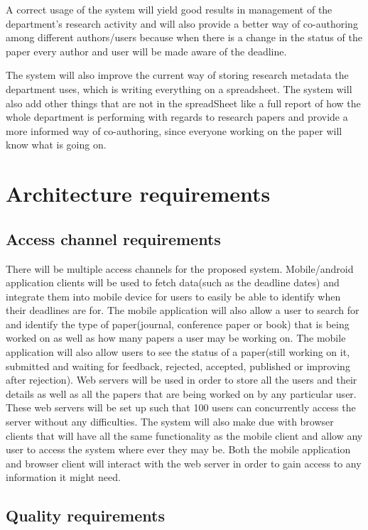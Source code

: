 \documentclass[a4paper,12pt]{report}
\begin{document}
A correct usage of the system will yield good results in management of the department's research activity and will also provide a better way of co-authoring among different authors/users because when there is a change in the status of the paper every author and user will be made aware of the deadline.

The system will also improve the current way of storing research metadata the department uses, which is  writing everything on a spreadsheet. The system will also add other things that are not in the spreadSheet like a full report of how the whole department is performing with regards to research papers and provide a more informed way of co-authoring, since everyone working on the paper will know what is going on.

\newpage
\section{Architecture requirements}
\subsection{Access channel requirements}

There will be multiple access channels for the proposed system. Mobile/android application clients will be used to fetch data(such as the deadline dates) and integrate them into mobile device for users to easily be able to identify when their deadlines are  for. The mobile application will also allow a user to search for and identify the type of paper(journal, conference paper or book) that is being worked on as well as how many papers a user may be working on. The mobile application will also allow users to see the status of a paper(still working on it, submitted and waiting for feedback, rejected, accepted, published or improving after rejection).
Web servers will be used in order to store all the users and their details as well as all the papers that are being worked on by any particular user. These web servers will be set up such that 100 users can concurrently access the server without any difficulties. The system will also make due with browser clients that will have all the same functionality as the mobile client and allow any user to access the system where ever they may be. Both the mobile application and browser client will interact with the web server in order to gain access to any information it might need. 


\subsection{Quality requirements}
\end{document}
